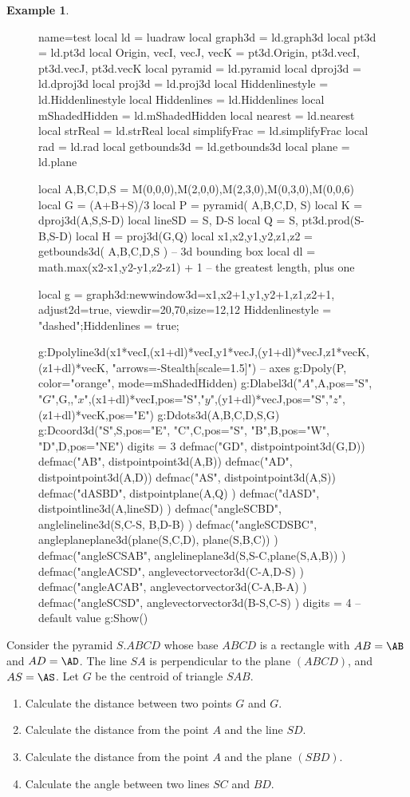 \documentclass[12pt]{article}
\theoremstyle{definition}
\newtheorem{EX}{Example}
\def\shortcuts{%
local ld = luadraw
local graph3d = ld.graph3d
local pt3d = ld.pt3d
local Origin, vecI, vecJ, vecK = pt3d.Origin, pt3d.vecI, pt3d.vecJ, pt3d.vecK
local pyramid = ld.pyramid
local dproj3d = ld.dproj3d
local proj3d = ld.proj3d
local Hiddenlinestyle = ld.Hiddenlinestyle
local Hiddenlines = ld.Hiddenlines
local mShadedHidden = ld.mShadedHidden
local nearest = ld.nearest
local strReal = ld.strReal
local simplifyFrac = ld.simplifyFrac
local rad = ld.rad
local getbounds3d = ld.getbounds3d
local plane = ld.plane
}%
\begin{document}
\begin{EX}
\begin{figure}[H]
  \centering
\begin{luadraw}{name=test}
\shortcuts
local A,B,C,D,S = M(0,0,0),M(2,0,0),M(2,3,0),M(0,3,0),M(0,0,6)
local G = (A+B+S)/3
local P = pyramid( {A,B,C,D}, S)
local K = dproj3d(A,{S,S-D})
local lineSD = {S, D-S} 
local Q = {S, pt3d.prod(S-B,S-D)}
local H = proj3d(G,Q)
local x1,x2,y1,y2,z1,z2 = getbounds3d( {A,B,C,D,S} ) -- 3d bounding box
local dl = math.max(x2-x1,y2-y1,z2-z1) + 1 -- the greatest length, plus one

local g = graph3d:new{window3d={x1,x2+1,y1,y2+1,z1,z2+1}, adjust2d=true, viewdir={20,70},size={12,12}}
Hiddenlinestyle = "dashed";Hiddenlines = true;

g:Dpolyline3d({{x1*vecI,(x1+dl)*vecI},{y1*vecJ,(y1+dl)*vecJ},{z1*vecK,(z1+dl)*vecK}}, "arrows={-Stealth[scale=1.5]}") -- axes
g:Dpoly(P, {color="orange", mode=mShadedHidden})
 g:Dlabel3d("$A$",A,{pos="S"}, "$G$",G,{},"$x$",(x1+dl)*vecI,{pos="S"},"$y$",(y1+dl)*vecJ,{pos="S"},"$z$",(z1+dl)*vecK,{pos="E"})
g:Ddots3d({A,B,C,D,S,G})
g:Dcoord3d("S",S,{pos="E"}, "C",C,{pos="S"}, "B",B,{pos="W"}, "D",D,{pos="NE"})
digits = 3
defmac("GD", distpointpoint3d(G,D))
defmac("AB", distpointpoint3d(A,B))
defmac("AD", distpointpoint3d(A,D))
defmac("AS", distpointpoint3d(A,S))
defmac("dASBD", distpointplane(A,Q) )
defmac("dASD", distpointline3d(A,lineSD) )
defmac("angleSCBD", anglelineline3d({S,C-S}, {B,D-B}) )
defmac("angleSCDSBC", angleplaneplane3d(plane(S,C,D), plane(S,B,C)) )
defmac("angleSCSAB", anglelineplane3d({S,S-C},plane(S,A,B)) )
defmac("angleACSD", anglevectorvector3d(C-A,D-S) )
defmac("angleACAB", anglevectorvector3d(C-A,B-A) )
defmac("angleSCSD", anglevectorvector3d(B-S,C-S) )
digits = 4 -- default value
g:Show()
\end{luadraw}
\caption{}
\end{figure}
Consider the pyramid $S.ABCD$ whose base $ABCD$ is a rectangle with $AB = \AB$ and $AD = \AD$. The line $SA$ is perpendicular to the plane $(ABCD)$, and $AS = \AS$. Let $G$ be the centroid of triangle $SAB$.
\begin{enumerate}[label=\arabic*)]
  \item Calculate the distance between two points $G$ and $G$.
  \item Calculate the distance from the point $A$ and the line $SD$.
  \item Calculate the distance from the point $A$ and the plane $(SBD)$.
  \item Calculate the angle between two lines $SC$ and $BD$.

\end{enumerate}
\end{EX}
\end{document}
